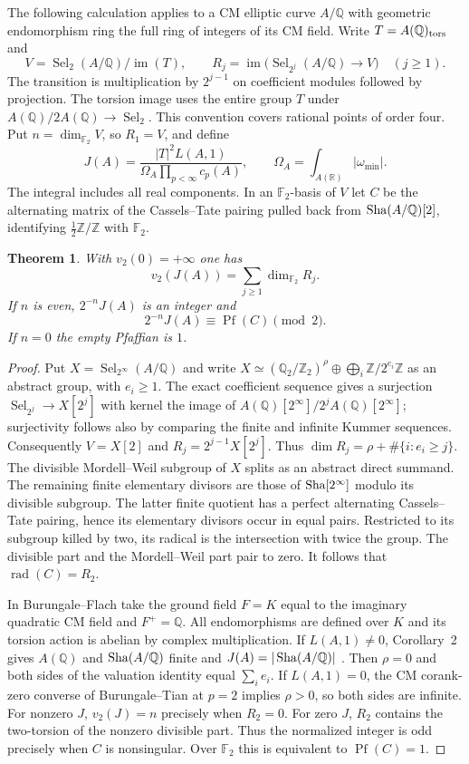 \documentclass[11pt]{article}
\newcommand{\Q}{\mathbb Q}\newcommand{\Z}{\mathbb Z}\newcommand{\F}{\mathbb F}
\DeclareMathOperator{\Sel}{Sel}\DeclareMathOperator{\Br}{Br}
\newtheorem{theorem}{Theorem}[section]\newtheorem{lemma}[theorem]{Lemma}\newtheorem{corollary}[theorem]{Corollary}
\begin{document}
The following calculation applies to a CM elliptic curve $A/\Q$ with geometric endomorphism ring the full ring of integers of its CM field.
Write $T=A(\Q)_{\rm tors}$ and
\[
 V=\Sel_2(A/\Q)/\operatorname{im}(T),\qquad
 R_j=\operatorname{im}\bigl(\Sel_{2^j}(A/\Q)\longrightarrow V\bigr)
 \quad(j\ge1).
\]
The transition is multiplication by $2^{j-1}$ on coefficient modules
followed by projection. The torsion image uses the entire group $T$
under $A(\Q)/2A(\Q)\to\Sel_2$. This convention covers rational
points of order four. Put $n=\dim_{\F_2}V$, so $R_1=V$, and define
\[
 J(A)=\frac{|T|^2L(A,1)}{\Omega_A\prod_{p<\infty}c_p(A)},\qquad
 \Omega_A=\int_{A(\mathbb R)}|\omega_{\min}|.
\]
The integral includes all real components. In an $\F_2$-basis of $V$
let $C$ be the alternating matrix of the Cassels--Tate pairing pulled back
from $\Sha(A/\Q)[2]$, identifying $\tfrac12\Z/\Z$ with $\F_2$.

\begin{theorem}\label{th:cm-pfaffian}
With $v_2(0)=+\infty$ one has
\[
 v_2(J(A))=\sum_{j\ge1}\dim_{\F_2}R_j.
\]
If $n$ is even, $2^{-n}J(A)$ is an integer and
\[
                 2^{-n}J(A)\equiv\operatorname{Pf}(C)\pmod 2.
\]
If $n=0$ the empty Pfaffian is $1$.
\end{theorem}

\begin{proof}
Put $X=\Sel_{2^\infty}(A/\Q)$ and write
$X\simeq(\Q_2/\Z_2)^\rho\oplus\bigoplus_i\Z/2^{e_i}\Z$
as an abstract group, with $e_i\ge1$. The exact coefficient sequence
gives a surjection $\Sel_{2^j}\to X[2^j]$ with kernel the image
of $A(\Q)[2^\infty]/2^j A(\Q)[2^\infty]$; surjectivity follows
also by comparing the finite and infinite Kummer sequences.
Consequently $V=X[2]$ and $R_j=2^{j-1}X[2^j]$. Thus
$\dim R_j=\rho+\#\{i:e_i\ge j\}$. The divisible Mordell--Weil
subgroup of $X$ splits as an abstract direct summand. The remaining
finite elementary divisors are those of $\mathop{\mathrm{Sha}}\nolimits[2^\infty]$ modulo its
divisible subgroup. The latter finite quotient has a perfect
alternating Cassels--Tate pairing, hence its elementary divisors occur
in equal pairs. Restricted to its subgroup killed by two, its radical
is the intersection with twice the group. The divisible part and the
Mordell--Weil part pair to zero. It follows that
$\operatorname{rad}(C)=R_2$.

In Burungale--Flach take the ground field $F=K$ equal to the imaginary quadratic CM field and $F^+=\Q$. All endomorphisms are defined over $K$ and its torsion action is abelian by complex multiplication. If $L(A,1)\ne0$, Corollary~2 gives $A(\Q)$ and
$\Sha(A/\Q)$ finite and $J(A)=|\Sha(A/\Q)|$ \cite{pfBF}. Then
$\rho=0$ and both sides of the valuation identity equal $\sum_i e_i$.
If $L(A,1)=0$, the CM corank-zero converse of Burungale--Tian
\cite{bt} at $p=2$ implies $\rho>0$, so both sides are infinite.
For nonzero $J$, $v_2(J)=n$ precisely when $R_2=0$. For zero $J$,
$R_2$ contains the two-torsion of the nonzero divisible part. Thus
the normalized integer is odd precisely when $C$ is nonsingular.
Over $\F_2$ this is equivalent to $\operatorname{Pf}(C)=1$.
\end{proof}
\end{document}

